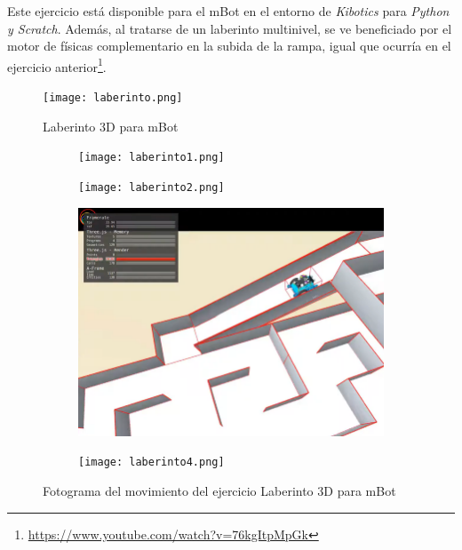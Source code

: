 Este ejercicio está disponible para el mBot en el entorno de \textit{Kibotics} para \textit{Python y Scratch}. Además, al tratarse de un laberinto multinivel, se ve beneficiado por el motor de físicas complementario en la subida de la rampa, igual que ocurría en el ejercicio anterior\footnote{\url{https://www.youtube.com/watch?v=76kgItpMpGk}}.

\begin{figure}[h!]
    \centering
    \texttt{[image: laberinto.png]}
    \caption{Laberinto 3D para mBot}
    \label{fig:Laberinto 3D para mBot}
\end{figure}

\begin{figure}[h!]
\begin{subfigure}[b]{0.5\textwidth}
    \texttt{[image: laberinto1.png]}
  \end{subfigure}
  \hfill
  \hfill
  \begin{subfigure}[b]{0.5\textwidth}
    \texttt{[image: laberinto2.png]}
  \end{subfigure}
    \hfill
    \hfill
  \begin{subfigure}[b]{0.5\textwidth}
    \includegraphics[width=\textwidth, height=\textwidth]{laberinto3ç.png}
  \end{subfigure}
    \hfill
  \begin{subfigure}[b]{0.5\textwidth}
    \texttt{[image: laberinto4.png]}
  \end{subfigure}
    \caption{Fotograma del movimiento del ejercicio Laberinto 3D para mBot}
    \label{fig:laberinto_movimiento}
\end{figure}


